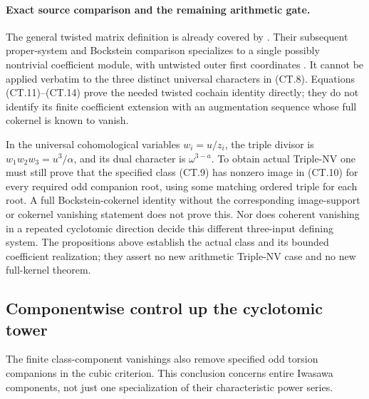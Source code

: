 \documentclass[11pt,a4paper]{article}
\theoremstyle{definition}
\begin{document}
\paragraph{Exact source comparison and the remaining arithmetic gate.}
The general twisted matrix definition is already covered by
\cite[Definitions~3.1.3, 3.2.1--3.2.2, pp.~22--23]{LLSWW2023}.
Their subsequent proper-system and Bockstein comparison specializes
to a single possibly nontrivial coefficient module, with untwisted
outer first coordinates
\cite[Definitions~3.3.1--3.3.2 and Theorems~3.3.4, 4.1.2,
pp.~24--29]{LLSWW2023}. It cannot be applied verbatim to the
three distinct universal characters in (CT.8). Equations
(CT.11)--(CT.14) prove the needed twisted cochain identity directly;
they do not identify its finite coefficient extension with an
augmentation sequence whose full cokernel is known to vanish.

In the universal cohomological variables \(w_i=u/z_i\), the
triple divisor is \(w_1w_2w_3=u^3/\alpha\), and its dual
character is \(\omega^{3-a}\). To obtain actual Triple-NV one
must still prove that the specified class (CT.9) has nonzero image
in (CT.10) for every required odd companion root, using some
matching ordered triple for each root. A full Bockstein-cokernel
identity without the corresponding image-support or cokernel
vanishing statement does not prove this. Nor does coherent
vanishing in a repeated cyclotomic direction decide this different
three-input defining system. The propositions above establish the
actual class and its bounded coefficient realization; they assert
no new arithmetic Triple-NV case and no new full-kernel theorem.

\subsection{Componentwise control up the cyclotomic tower}
\label{sec:componentwise-iwasawa-control}

The finite class-component vanishings also remove specified odd torsion
companions in the cubic criterion. This conclusion concerns entire
Iwasawa components, not just one specialization of their characteristic
power series.
\end{document}
